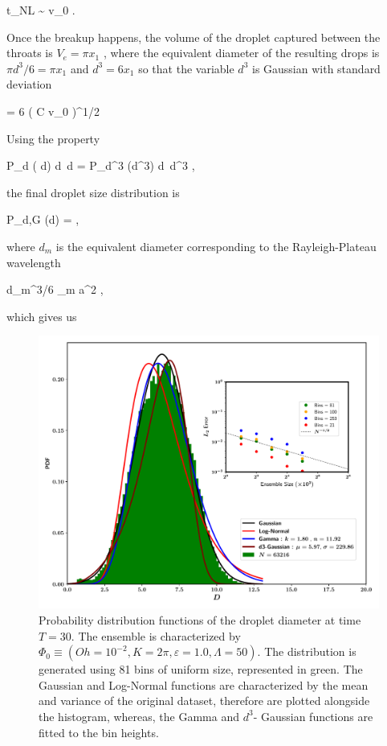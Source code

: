 \be
t_{NL} \sim {} \ln v_0 .
\nd

Once the breakup happens, the volume of the droplet captured between the throats is
$  V_e = \pi  x_1$ , where the equivalent diameter of the resulting drops is
$\pi d^3/6 =  \pi  x_1$  and $d^3 = 6  x_1$ so that
the variable $d^3$ is Gaussian with standard deviation

\be
\sigma = 6  \pi \left(  {C \ln v_0} \right)^{1/2}
\label{d6_std}
\nd

Using the property 

\be
P_d ( d) {\textrm{d}} d = P_{d^3} (d^3) {\textrm{d}} d^3 ,
\nd

the final droplet size distribution is

\be
  P_{d,G} (d) =   \exp{} , 
\label{theory_d6}
\nd

where $d_m$ is the equivalent diameter corresponding to the Rayleigh-Plateau wavelength

\be
  \pi  d_m^3/6 \simeq  \pi \lambda_m a^2 , 
\nd

which gives us 

\be
    
\nd

\begin{figure}
\centering
\includegraphics{plots/drop_stats/d6_scaling_compare.pdf}
\caption{Probability distribution functions of the droplet diameter at time $T = 30$. 
The ensemble is characterized by $\Phi_0 \equiv \left( Oh = 10^{-2}, K = 2\pi , \varepsilon = 1.0 , \Lambda = 50 \right)$. 
The distribution is generated using 81 bins of uniform size, represented in green.  
The Gaussian and Log-Normal functions are characterized by the mean and variance of the original dataset, 
therefore are plotted alongside the histogram, whereas, the Gamma and $d^3$- Gaussian functions are fitted to the bin heights.
	}
\label{d3_gauss}
\end{figure}


